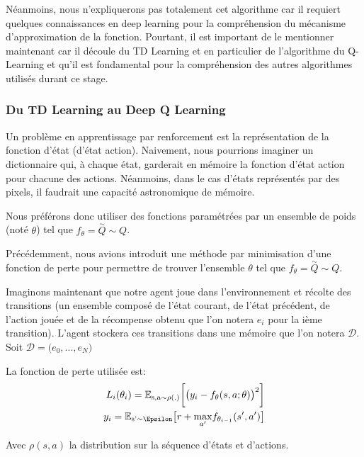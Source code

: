 Néanmoins, nous n'expliquerons pas totalement cet algorithme car il requiert quelques connaissances en deep learning pour la compréhension du mécanisme d'approximation de la fonction. Pourtant, il est important de le mentionner maintenant car il découle du TD Learning et en particulier de l'algorithme du Q-Learning et qu'il est fondamental pour la compréhension des autres algorithmes utilisés durant ce stage.

\subsubsection{Du TD Learning au Deep Q Learning}

Un problème en apprentissage par renforcement est la représentation de la fonction d'état (d'état action). Naivement, nous pourrions imaginer un dictionnaire qui, à chaque état, garderait en mémoire la fonction d'état action pour chacune des actions. Néanmoins, dans le cas d'états représentés par des pixels, il faudrait une capacité astronomique de mémoire. 

Nous préférons donc utiliser des fonctions paramétrées par un ensemble de poids (noté $\theta$) tel que $f_\theta = \overset{\sim}{Q} \sim Q$. 

Précédemment, nous avions introduit une méthode par minimisation d'une fonction de perte pour permettre de trouver l'ensemble $\theta$ tel que $f_\theta = \overset{\sim}{Q} \sim Q$. 

Imaginons maintenant que notre agent joue dans l'environnement et récolte des transitions (un ensemble composé de l'état courant, de l'état précédent, de l'action jouée et de la récompense obtenu que l'on notera $e_i$ pour la ième transition). L'agent stockera ces transitions dans une mémoire que l'on notera $\mathcal{D}$. Soit $\mathcal{D} = \big(e_0, ..., e_N\big)$ 

La fonction de perte utilisée est: 
\begin{align}
L_i(\theta_i) = \mathbb{E_{\text{s}, \text{a} \sim \rho(.)}}\bigg[ \big( y_i - f_\theta(s, a; \theta)\big)^2 \bigg]\\
y_i = \mathbb{E}_{\text{s'} \sim \Epsilon}\big[r + \underset{a'}{\max}f_{\theta_{i-1}}(s', a') \big] 
\end{align}

Avec $\rho(s, a)$ la distribution sur la séquence d'états et d'actions.

